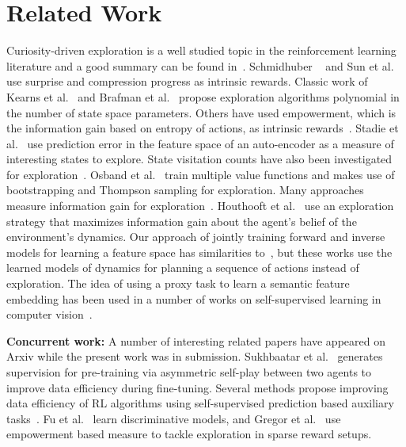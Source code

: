 \documentclass{article}
\begin{document}
\section{Related Work}
Curiosity-driven exploration is a well studied topic in the reinforcement learning literature and a good summary can be found in~\cite{oudeyer2007intrinsic,oudeyer2009intrinsic}. Schmidhuber ~ and Sun et al.~ use surprise and compression progress as intrinsic rewards. Classic work of Kearns et al.~ and Brafman et al.~ propose exploration algorithms polynomial in the number of state space parameters. Others have used empowerment, which is the information gain based on entropy of actions, as intrinsic rewards~\cite{klyubin2005empowerment,mohamed2015variational}. Stadie et al.~ use prediction error in the feature space of an auto-encoder as a measure of interesting states to explore.
State visitation counts have also been investigated for exploration~\cite{oh2015action,bellemare2016unifying,tang2016exploration}.
Osband et al.~ train multiple value functions and makes use of bootstrapping and Thompson sampling for exploration. Many approaches measure information gain for exploration~\cite{still2012information,little2014learning,storck1995reinforcement}. Houthooft et al.~ use an exploration strategy that maximizes information gain about the agent's belief of the environment's dynamics. Our approach of jointly training forward and inverse models for learning a feature space has similarities to~\cite{jordan1992forward,wolpert1995internal,agrawal2016learning}, but these works use the learned models of dynamics for planning a sequence of actions instead of exploration. The idea of using a proxy task to learn a semantic feature embedding has been used in a number of works on self-supervised learning in computer vision~\cite{goroshin2015unsupervised,agrawal2015learning,doersch2015unsupervised,jayaraman2015learning,wang2015unsupervised,pathak2016context}.

{\bf Concurrent work:}
A number of interesting related papers have appeared on Arxiv while the present work was in submission.
Sukhbaatar et al.~ generates supervision for pre-training via asymmetric self-play between two agents to improve data efficiency during fine-tuning. Several methods propose improving data efficiency of RL algorithms using self-supervised prediction based auxiliary tasks~\cite{jaderberg2017reinforcement,shelhamer2017loss}. Fu et al.~ learn discriminative models, and Gregor et al.~ use empowerment based measure to tackle exploration in sparse reward setups.
\end{document}

